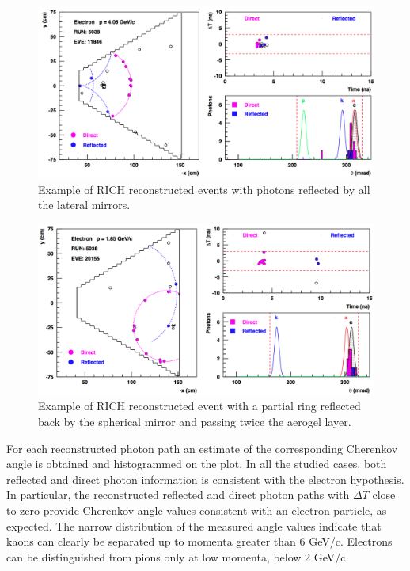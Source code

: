 \documentclass[5p,times,twocolumn]{elsarticle}
\def\dT{$\Delta T$ }
\begin{document}
\begin{figure}[t]
\begin{center}
\includegraphics[width=0.9\columnwidth]{Event_11846.png}
\end{center}
\caption{Example of RICH reconstructed events with photons reflected by all the lateral mirrors.} 
\label{Fig:Event3}
\end{figure}


\begin{figure}[t]
\begin{center}
\includegraphics[width=0.9\columnwidth]{Event_20155.png}
\end{center}
\caption{Example of RICH reconstructed event with a partial ring reflected back by the spherical mirror and passing twice the aerogel layer.}
\label{Fig:Event4}
\end{figure}

\twocolumn

For each reconstructed photon path an estimate of the corresponding Cherenkov angle is obtained and histogrammed on the plot. In all the studied cases, both reflected and direct photon information is consistent with the electron hypothesis. In particular, the reconstructed reflected and direct photon paths with \dT close to zero provide Cherenkov angle values consistent with an electron particle, as expected. The narrow distribution of the measured angle values indicate that kaons can clearly be separated up to momenta greater than 6 GeV/c. Electrons can be distinguished from pions only at low momenta, below 2 GeV/c.
\end{document}
